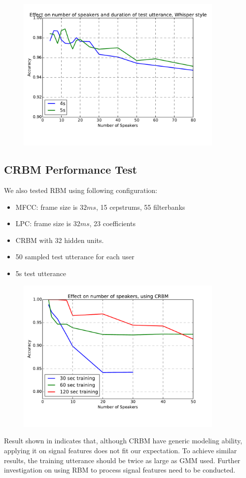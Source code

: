 \begin{figure}[H]
  \centering
  \includegraphics[width=0.9\textwidth]{img/whisper.pdf}
\end{figure}

\subsection{CRBM Performance Test}
We also tested RBM using following configuration:
\begin{itemize}
  \item MFCC: frame size is $32 ms $, 15 cepstrums, 55 filterbanks
  \item LPC: frame size is $32 ms $, 23 coefficients
  \item CRBM with 32 hidden units.
  \item 50 sampled test utterance for each user
  \item 5s test utterance
\end{itemize}

\begin{figure}[H]
  \centering
  \includegraphics[width=0.9\textwidth]{img/crbm.pdf}
  \caption{\label{crbmresult}}
\end{figure}

Result shown in  indicates that, although CRBM have
generic modeling ability, applying it on signal features does not fit
our expectation. To achieve similar results, the training utterance should
be twice as large as GMM used. Further investigation on using RBM to
process signal features need to be conducted.


